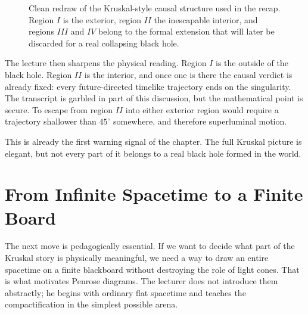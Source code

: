 \begin{figure}[htbp]
\centering
{}
\caption{Clean redraw of the Kruskal-style causal structure used in the recap. Region \(I\) is the exterior, region \(II\) the inescapable interior, and regions \(III\) and \(IV\) belong to the formal extension that will later be discarded for a real collapsing black hole.}
\end{figure}

The lecture then sharpens the physical reading. Region \(I\) is the outside of the black hole. Region \(II\) is the interior, and once one is there the causal verdict is already fixed: every future-directed timelike trajectory ends on the singularity. The transcript is garbled in part of this discussion, but the mathematical point is secure. To escape from region \(II\) into either exterior region would require a trajectory shallower than \(45^\circ\) somewhere, and therefore superluminal motion.

This is already the first warning signal of the chapter. The full Kruskal picture is elegant, but not every part of it belongs to a real black hole formed in the world.

\section{From Infinite Spacetime to a Finite Board}

The next move is pedagogically essential. If we want to decide what part of the Kruskal story is physically meaningful, we need a way to draw an entire spacetime on a finite blackboard without destroying the role of light cones. That is what motivates Penrose diagrams. The lecturer does not introduce them abstractly; he begins with ordinary flat spacetime and teaches the compactification in the simplest possible arena.

